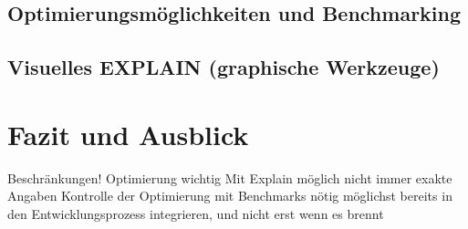 \subsection{Optimierungsmöglichkeiten und Benchmarking}
\subsection{Visuelles EXPLAIN (graphische Werkzeuge)}

\section{Fazit und Ausblick}

Beschränkungen!
Optimierung wichtig
Mit Explain möglich
nicht immer exakte Angaben
Kontrolle der Optimierung mit Benchmarks nötig
möglichst bereits in den Entwicklungsprozess integrieren, und nicht erst wenn es brennt
